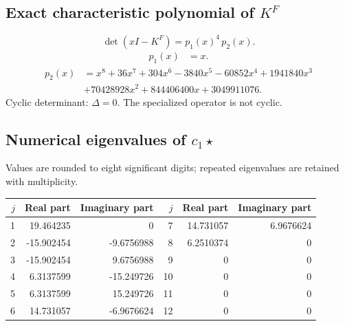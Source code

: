\documentclass[10pt,a4paper]{article}
\begin{document}
\subsection*{Exact characteristic polynomial of $K^F$}
\[\det(xI-K^F)=p_{1}(x)^{4}\,p_{2}(x).\]
\[\begin{aligned}p_{1}(x)&=x.\end{aligned}\]
\[\begin{aligned}p_{2}(x)&=x^{8} + 36 x^{7} + 304 x^{6} - 3840 x^{5} - 60852 x^{4} + 1941840 x^{3}\\&+70428928 x^{2} + 844406400 x + 3049911076.\end{aligned}\]
Cyclic determinant: $\Delta=0$. The specialized operator is not cyclic.
\subsection*{Numerical eigenvalues of $c_1\star$}
Values are rounded to eight significant digits; repeated eigenvalues are retained with multiplicity.
\begin{center}\small\begin{tabular}{rrr@{\qquad}rrr}\toprule $j$ & Real part & Imaginary part & $j$ & Real part & Imaginary part\\\midrule
1 & 19.464235 & 0 & 7 & 14.731057 & 6.9676624\\
2 & -15.902454 & -9.6756988 & 8 & 6.2510374 & 0\\
3 & -15.902454 & 9.6756988 & 9 & 0 & 0\\
4 & 6.3137599 & -15.249726 & 10 & 0 & 0\\
5 & 6.3137599 & 15.249726 & 11 & 0 & 0\\
6 & 14.731057 & -6.9676624 & 12 & 0 & 0\\
\bottomrule\end{tabular}\end{center}
\end{document}
